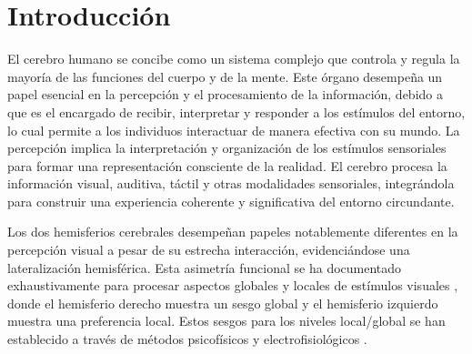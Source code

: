 \documentclass{article}
\title{}
\author{Mari\'e del Valle Reyes}
\date{C411}
\begin{document}
	
	\maketitle
	
	\section*{Introducci\'on}
	El cerebro humano se concibe como un sistema complejo que controla y regula la mayoría de las funciones del cuerpo y de la mente. Este \'organo desempeña un papel esencial en la percepción y el procesamiento de la información, debido a que es el encargado de recibir, interpretar y responder a los estímulos del entorno, lo cual permite a los individuos interactuar de manera efectiva con su mundo. La percepción implica la interpretación y organización de los estímulos sensoriales para formar una representación consciente de la realidad. El cerebro procesa la información visual, auditiva, táctil y otras modalidades sensoriales, integrándola para construir una experiencia coherente y significativa del entorno circundante.
	
	Los dos hemisferios cerebrales desempeñan papeles notablemente diferentes en la percepción visual a pesar de su estrecha interacción, evidenciándose una lateralización hemisférica. Esta asimetría funcional se ha documentado exhaustivamente para procesar aspectos globales y locales de estímulos visuales \cite{flevaris_spatial_2016}, donde el hemisferio derecho muestra un sesgo global y el hemisferio izquierdo muestra una preferencia local. Estos sesgos para los niveles local/global se han establecido a través de métodos psicofísicos \cite{brederoo_hemispheric_2017, brederoo_reproducibility_2019} y electrofisiológicos \cite{flevaris_attending_2014, iglesias-fuster_asynchronous_2015, jiang_neural_2005}.
	
\end{document}
